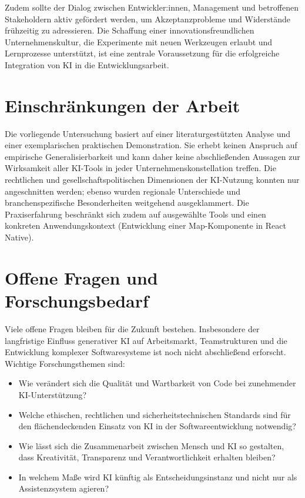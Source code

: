 Zudem sollte der Dialog zwischen Entwickler:innen, Management und betroffenen
Stakeholdern aktiv gefördert werden, um Akzeptanzprobleme und Widerstände
frühzeitig zu adressieren. Die Schaffung einer innovationsfreundlichen
Unternehmenskultur, die Experimente mit neuen Werkzeugen erlaubt und
Lernprozesse unterstützt, ist eine zentrale Voraussetzung für die erfolgreiche
Integration von KI in die Entwicklungsarbeit.

\section{Einschränkungen der Arbeit}
Die vorliegende Untersuchung basiert auf einer literaturgestützten Analyse und
einer exemplarischen praktischen Demonstration. Sie erhebt keinen Anspruch auf
empirische Generalisierbarkeit und kann daher keine abschließenden Aussagen zur
Wirksamkeit aller KI-Tools in jeder Unternehmenskonstellation treffen. Die
rechtlichen und gesellschaftspolitischen Dimensionen der KI-Nutzung konnten nur
angeschnitten werden; ebenso wurden regionale Unterschiede und
branchenspezifische Besonderheiten weitgehend ausgeklammert. Die
Praxiserfahrung beschränkt sich zudem auf ausgewählte Tools und einen konkreten
Anwendungskontext (Entwicklung einer Map-Komponente in React Native).

\section{Offene Fragen und Forschungsbedarf}
Viele offene Fragen bleiben für die Zukunft bestehen. Insbesondere der
langfristige Einfluss generativer KI auf Arbeitsmarkt, Teamstrukturen und die
Entwicklung komplexer Softwaresysteme ist noch nicht abschließend erforscht.
Wichtige Forschungsthemen sind:
\begin{itemize}
    \item Wie verändert sich die Qualität und Wartbarkeit von Code bei zunehmender
          KI-Unterstützung?
    \item Welche ethischen, rechtlichen und sicherheitstechnischen Standards sind für den
          flächendeckenden Einsatz von KI in der Softwareentwicklung notwendig?
    \item Wie lässt sich die Zusammenarbeit zwischen Mensch und KI so gestalten, dass
          Kreativität, Transparenz und Verantwortlichkeit erhalten bleiben?
    \item In welchem Maße wird KI künftig als Entscheidungsinstanz und nicht nur als
          Assistenzsystem agieren?
\end{itemize}

